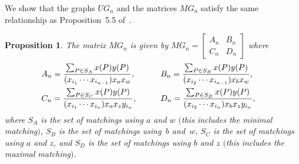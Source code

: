 \documentclass[11pt]{article}
\numberwithin{equation}{section}
\newtheorem{Proposition}[Theorem]{Proposition}
\begin{document}
We show that the graphs $UG_n$ and the matrices $MG_n$ satisfy the same relationship as Proposition~5.5 of~\cite{MW}.

\begin{Proposition}\label{prop:MatchingMatrices}
The matrix $MG_n$ is given by $MG_n = \left[\begin{smallmatrix} A_n & B_n \\ C_n & D_n \end{smallmatrix}\right]$ where
\begin{alignat*}{3}
& A_n = \frac{\sum_{P \in S_A} x(P) y(P)}{(x_{i_1}\cdots x_{i_{n-1}}) x_ax_w}, \qquad && B_n = \frac{\sum_{P \in S_B} x(P) y(P)}{(x_{i_2}\cdots x_{i_{n-1}}) x_bx_w},&
\vspace{1mm}\\
& C_n = \frac{\sum_{P \in S_C} x(P) y(P)}{(x_{i_1}\cdots x_{i_{n}}) x_ax_z y_{i_n}}, \qquad && D_n = \frac{\sum_{P \in S_D} x(P) y(P)}{(x_{i_2}\cdots x_{i_{n}}) x_bx_z y_{i_n}}, &
\end{alignat*}
where $S_A$ is the set of matchings using $a$ and $w$ $($this includes the minimal matching$)$, $S_B$ is the set of matchings using~$b$ and~$w$, $S_C$ is the set of matchings using $a$ and $z$, and $S_D$ is the set of matchings using $b$ and $z$ $($this includes the maximal matching$)$.
\end{Proposition}
\end{document}
